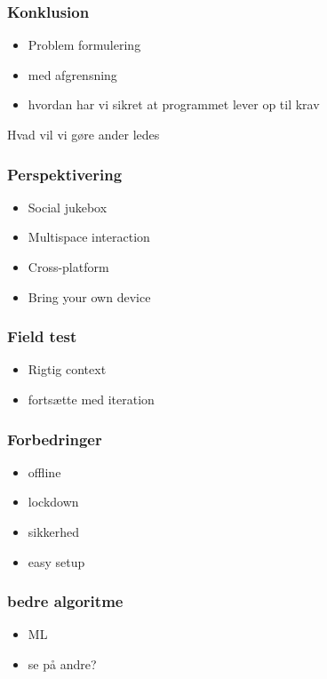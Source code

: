 \begin{frame}
	\frametitle{Konklusion}
	\begin{itemize}
		\item Problem formulering
		\item med afgrensning
		\item hvordan har vi sikret at programmet lever op til krav
	\end{itemize}
\end{frame}

Hvad vil vi gøre ander ledes
\begin{frame}
	\frametitle{Perspektivering}
	\begin{itemize}
		\item Social jukebox
		\item Multispace interaction
		\item Cross-platform
		\item Bring your own device
	\end{itemize}
\end{frame}

\begin{frame}
	\frametitle{Field test}
	\begin{itemize}
		\item Rigtig context
		\item fortsætte med iteration
	\end{itemize}
\end{frame}

\begin{frame}
	\frametitle{Forbedringer}
	\begin{itemize}
		\item offline
		\item lockdown
		\item sikkerhed
		\item easy setup
	\end{itemize}
\end{frame}



\begin{frame}
	\frametitle{bedre algoritme}
	\begin{itemize}
		\item ML
		\item se på andre?
	\end{itemize}
\end{frame}